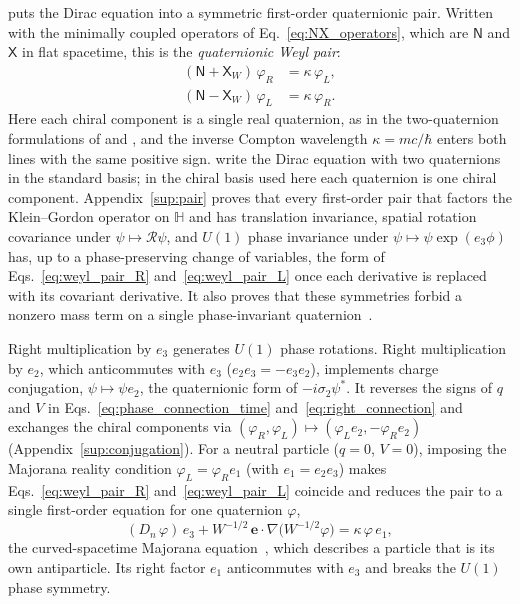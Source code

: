 \documentclass[aps,prd,onecolumn,tightenlines,nofootinbib,notitlepage,11pt,floatfix]{revtex4-2}
\theoremstyle{indentedtheorem}
\begin{document}
puts the Dirac equation into a symmetric first-order quaternionic pair. Written with the minimally coupled operators of Eq.~\eqref{eq:NX_operators}, which are $\mathsf{N}$ and $\mathsf{X}$ in flat spacetime, this is the \emph{quaternionic Weyl pair}:
\begin{align}
    (\mathsf{N}+\mathsf{X}_W)\,\varphi_R &= \kappa\,\varphi_L , \label{eq:weyl_pair_R} \\
    (\mathsf{N}-\mathsf{X}_W)\,\varphi_L &= \kappa\,\varphi_R . \label{eq:weyl_pair_L}
\end{align}
Here each chiral component is a single real quaternion, as in the two-quaternion formulations of \citet{Hestenes1967Real} and \citet{DeLeoRodrigues1998Quaternionic}, and the inverse Compton wavelength $\kappa=mc/\hbar$ enters both lines with the same positive sign. \citet{DeLeoRodrigues1998Quaternionic} write the Dirac equation with two quaternions in the standard basis; in the chiral basis used here each quaternion is one chiral component. Appendix~\ref{sup:pair} proves that every first-order pair that factors the Klein--Gordon operator on $\mathbb{H}$ and has translation invariance, spatial rotation covariance under $\psi\mapsto\mathcal{R}\psi$, and $U(1)$ phase invariance under $\psi\mapsto\psi\exp(e_3\phi)$ has, up to a phase-preserving change of variables, the form of Eqs.~\eqref{eq:weyl_pair_R} and~\eqref{eq:weyl_pair_L} once each derivative is replaced with its covariant derivative. It also proves that these symmetries forbid a nonzero mass term on a single phase-invariant quaternion~\citep{Pauli1936Contributions}.

Right multiplication by $e_3$ generates $U(1)$ phase rotations. Right multiplication by $e_2$, which anticommutes with $e_3$ ($e_2 e_3 = -e_3 e_2$), implements charge conjugation, $\psi\mapsto\psi e_2$, the quaternionic form of $-i\sigma_2\psi^*$. It reverses the signs of $q$ and $V$ in Eqs.~\eqref{eq:phase_connection_time} and~\eqref{eq:right_connection} and exchanges the chiral components via $(\varphi_R,\varphi_L)\mapsto(\varphi_L e_2, -\varphi_R e_2)$ (Appendix~\ref{sup:conjugation}). For a neutral particle ($q=0$, $V=0$), imposing the Majorana reality condition $\varphi_L = \varphi_R e_1$ (with $e_1 = e_2 e_3$) makes Eqs.~\eqref{eq:weyl_pair_R} and~\eqref{eq:weyl_pair_L} coincide and reduces the pair to a single first-order equation for one quaternion $\varphi$,
\begin{equation}
    (D_n\,\varphi)\,e_3 + W^{-1/2}\,\mathbf{e}\cdot\nabla\big(W^{-1/2}\varphi\big) = \kappa\,\varphi\,e_1 ,
    \label{eq:majorana_single}
\end{equation}
the curved-spacetime Majorana equation~\citep{Majorana1937Teoria,ArodzSwierczynski2021Majorana}, which describes a particle that is its own antiparticle. Its right factor $e_1$ anticommutes with $e_3$ and breaks the $U(1)$ phase symmetry.
\end{document}
